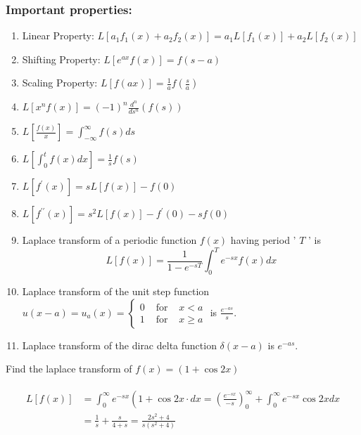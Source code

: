 \subsubsection{Important properties:}
\begin{enumerate}
	\item Linear Property: $L\left[a_{1} f_{1}(x)+a_{2} f_{2}(x)\right]=a_{1} L\left[f_{1}(x)\right]+a_{2} L\left[f_{2}(x)\right]$
	\item Shifting Property: $L\left[e^{a x} f(x)\right]=f(s-a)$
	\item Scaling Property: $L[f(a x)]=\frac{1}{a} f\left(\frac{s}{a}\right)$
	\item $L\left[x^{n} f(x)\right]=(-1)^{n} \frac{d^{n}}{d s^{n}}(f(s))$
	\item $L\left[\frac{f(x)}{x}\right]=\int_{-\infty}^{\infty} f(s) d s$
	\item $L\left[\int_{0}^{t} f(x) d x\right]=\frac{1}{s} f(s)$
	\item $L\left[f^{\prime}(x)\right]=s L[f(x)]-f(0)$
	\item  $L\left[f^{\prime \prime}(x)\right]=s^{2} L[f(x)]-f^{\prime}(0)-s f(0)$
	\item Laplace transform of a periodic function $f(x)$ having period ' $T$ ' is $$L[f({x})]=\frac{1}{1-e^{-s T}} \int_{0}^{T} e^{-s x} f({x}) d {x}$$
	\item Laplace transform of the unit step function $u(x-a)=u_{a}(x)=\left\{\begin{array}{lll}0 & \text { for } & x<a \\ 1 & \text { for } & x \geq a\end{array}\right.$ is $\frac{e^{-a s}}{s}$.
	\item Laplace transform of the dirac delta function $\delta(x-a)$ is $e^{-a s}$.
\end{enumerate}
\begin{exercise}
	Find the laplace transform of $f(x)=(1+\cos 2 x)$
\end{exercise}
\begin{answer}
	\begin{align*}
	\begin{aligned}
	L[f(x)] &=\int_{0}^{\infty} e^{-s x}\left(1+\cos 2 x \cdot d x=\left(\frac{e^{-s x}}{-s}\right)_{0}^{\infty}+\int_{0}^{\infty} e^{-s x} \cos 2 x d x\right.\\
	&=\frac{1}{s}+\frac{s}{4+s}=\frac{2 s^{2}+4}{s\left(s^{2}+4\right)}
	\end{aligned}
	\end{align*}
\end{answer}
